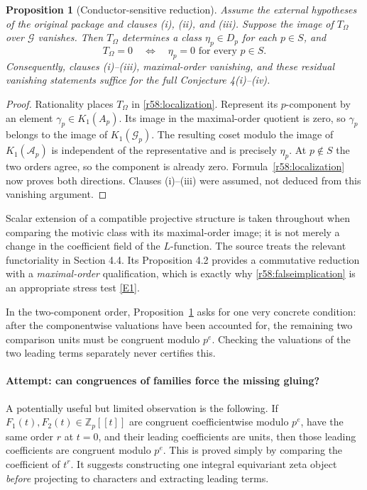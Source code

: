 \documentclass[11pt,a4paper]{article}
\newcommand{\Z}{\mathbb{Z}}
\newcommand{\eref}[2]{\hyperlink{extra:#1:#2}{[E#2]}}
\newtheorem{notebookproposition}[notebooklemma]{Proposition}
\numberwithin{equation}{section}
\begin{document}
\begin{notebookproposition}[Conductor-sensitive reduction]\label{r58:reduction}
Assume the external hypotheses of the original package and clauses (i), (ii), and (iii). Suppose the image of $T_\Omega$ over $\mathcal G$ vanishes. Then $T_\Omega$ determines a class $\eta_p\in D_p$ for each $p\in S$, and
\[
 T_\Omega=0\quad\Longleftrightarrow\quad
                \eta_p=0\text{ for every }p\in S.
\]
Consequently, clauses (i)--(iii), maximal-order vanishing, and these residual vanishing statements suffice for the \emph{full} Conjecture 4(i)--(iv).
\end{notebookproposition}
\begin{proof}
Rationality places $T_\Omega$ in \eqref{r58:localization}. Represent its $p$-component by an element $\gamma_p\in K_1(A_p)$. Its image in the maximal-order quotient is zero, so $\gamma_p$ belongs to the image of $K_1(\mathcal G_p)$. The resulting coset modulo the image of $K_1(\mathcal A_p)$ is independent of the representative and is precisely $\eta_p$. At $p\notin S$ the two orders agree, so the component is already zero. Formula~\eqref{r58:localization} now proves both directions. Clauses (i)--(iii) were assumed, not deduced from this vanishing argument.
\end{proof}

Scalar extension of a compatible projective structure is taken throughout when comparing the motivic class with its maximal-order image; it is not merely a change in the coefficient field of the $L$-function. The source treats the relevant functoriality in Section 4.4. Its Proposition 4.2 provides a commutative reduction with a \emph{maximal-order} qualification, which is exactly why \eqref{r58:falseimplication} is an appropriate stress test \eref{58}{1}.

In the two-component order, Proposition~\ref{r58:reduction} asks for one very concrete condition: after the componentwise valuations have been accounted for, the remaining two comparison units must be congruent modulo $p^e$. Checking the valuations of the two leading terms separately never certifies this.

\paragraph{Attempt: can congruences of families force the missing gluing?}
A potentially useful but limited observation is the following. If
$F_1(t),F_2(t)\in\Z_p[[t]]$ are congruent coefficientwise modulo $p^e$, have the same order $r$ at $t=0$, and their leading coefficients are units, then those leading coefficients are congruent modulo $p^e$. This is proved simply by comparing the coefficient of $t^r$. It suggests constructing one integral equivariant zeta object \emph{before} projecting to characters and extracting leading terms.
\end{document}
